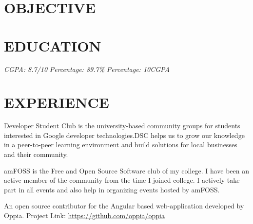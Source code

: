 \documentclass[11pt,a4paper,sans]{moderncv}        %
\begin{document}
\makecvtitle

\section{OBJECTIVE}

\section{EDUCATION}
{\textit{CGPA: 8.7/10}}{}  %
{\textit{Percentage: 89.7\%  }}{}  %
{\textit{Percentage: 10CGPA  }}{}  %

\section{EXPERIENCE}

{Developer Student Club is the university-based community groups for students interested in Google developer technologies.DSC helps us to grow our knowledge in a peer-to-peer learning environment and build solutions for local businesses and their community.}


{amFOSS is the Free and Open Source Software club of my college. I have been an active member of the community from the time I joined college. I actively take part in all events and also help in organizing events hosted by amFOSS.}

{ An open source contributor for the Angular based web-application developed by Oppia. Project Link: {\newline} 
\url{https://github.com/oppia/oppia}}{}  %
\end{document}

